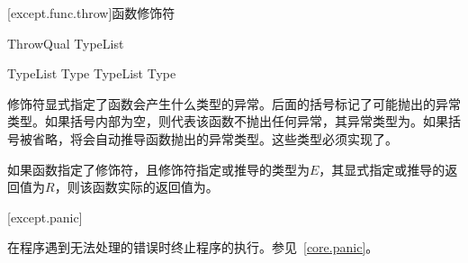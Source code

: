 [except.func.throw]{函数修饰符}

\begin{bnf}{ThrowQual}
     \terminal{(} TypeList\bnfs \terminal{)} \br
\end{bnf}

\begin{bnf}{TypeList}
    Type \br
    TypeList \terminal{,} Type
\end{bnf}

\pnum
{}修饰符显式指定了函数会产生什么类型的异常。后面的括号标记了可能抛出的异常类型。如果括号内部为空，则代表该函数不抛出任何异常，其异常类型为。如果括号被省略，将会自动推导函数抛出的异常类型。这些类型必须实现了。

\pnum
如果函数指定了修饰符，且修饰符指定或推导的类型为$E$，其显式指定或推导的返回值为$R$，则该函数实际的返回值为。

[except.panic]{}

\pnum
{}在程序遇到无法处理的错误时终止程序的执行。参见~\ref{core.panic}。